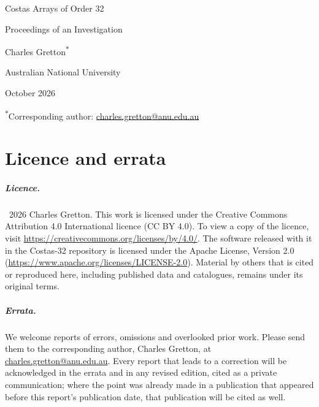 \begin{titlepage}
\centering
\vspace*{3cm}
{\LARGE Costas Arrays of Order 32\par}
\vspace{0.6cm}
{\Large Proceedings of an Investigation\par}
\vspace{2cm}
{\large Charles Gretton\textsuperscript{$\ast$}\par}
{\normalsize Australian National University\par}
\vspace{1cm}
{\normalsize October 2026\par}
\vfill
{\small\textsuperscript{$\ast$}Corresponding author:
\href{mailto:charles.gretton@anu.edu.au}{charles.gretton@anu.edu.au}\par}
\end{titlepage}

\chapter*{Licence and errata}

\paragraph{Licence.} \textcopyright\ 2026 Charles Gretton. This work is licensed under the Creative Commons Attribution 4.0 International licence (CC BY 4.0).
To view a copy of the licence, visit \url{https://creativecommons.org/licenses/by/4.0/}. The software released
with it in the Costas-32 repository is licensed under the Apache License, Version 2.0
(\url{https://www.apache.org/licenses/LICENSE-2.0}). Material by others that is cited or reproduced here,
including published data and catalogues, remains under its original terms.

\paragraph{Errata.} We welcome reports of errors, omissions and overlooked prior work. Please send them to the
corresponding author, Charles Gretton, at \href{mailto:charles.gretton@anu.edu.au}{charles.gretton@anu.edu.au}.
Every report that leads to a correction will be acknowledged in the errata and in any revised edition,
cited as a private communication; where the point was already made in a publication that appeared before
this report's publication date, that publication will be cited as well.

